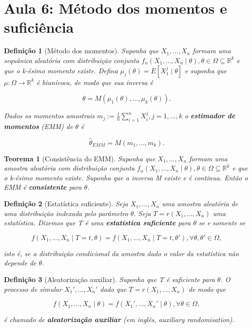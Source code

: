 \documentclass{article}
\newtheorem{theorem}{Teorema}
\newtheorem{definition}{Definição}
\begin{document}
\section*{Aula 6: Método dos momentos e suficiência}

\begin{definition}[Método dos momentos]
Suponha que $X_1, \ldots, X_n$ formam uma sequânica aleatória com distribuição conjunta $f_n (X_1, \ldots, X_n \mid \theta), \theta \in \Omega \subseteq \mathbb{R}^k$ e que o k-ésimo momento existe. Defina $\mu_j (\theta) = E[X_1^j \mid \theta]$ e suponha que $\mu: \Omega \rightarrow \mathbb{R}^k$ é biunívoca, de modo que sua inversa é

$$\theta = M(\mu_1(\theta), \ldots, \mu_k(\theta)).$$

Dados os momentos amostrais $m_j := \frac{1}{n} \sum_{i=1}^n X_i^j, j = 1, \ldots, k$ o \textbf{estimador de momentos} (EMM) de $\theta$ é

$$\hat{\theta}_{EMM} = M(m_1, \ldots, m_k).$$
\end{definition}

\begin{theorem}[Consistência do EMM]
Suponha que $X_1, \ldots, X_n$ formam uma amostra aleatória com distribuição conjunta  $f_n (X_1, \ldots, X_n \mid \theta), \theta \in \Omega \subseteq \mathbb{R}^k$ e que o k-ésimo momento existe. Suponha que a inversa M existe e é continua. Então o EMM é \textbf{consistente} para $\theta$.
\end{theorem}

\begin{definition}[Estatística suficiente]
Seja $X_1, \ldots, X_n$ uma amostra aleatória de uma distribuição indexada pelo parâmetro $\theta$. Seja $T = r(X_1, \ldots, X_n)$ uma estatística. Dizemos que T é uma \textbf{estatística suficiente} para $\theta$ se e somente se

\begin{equation}
    f(X_1, \ldots, X_n \mid T = t, \theta) = f(X_1, \ldots, X_n \mid T = t, \theta'), \forall \theta, \theta' \in \Omega,
\end{equation}

isto é, se a distribuição condicional da amostra dado o valor da estatística não depende de $\theta$.
\end{definition}

\begin{definition}[Aleatorização auxiliar]
 Suponha que T é suficiente para $\theta$. O processo de simular $X_1', \ldots, X_n'$ dado que $T = r(X_1, \ldots, X_n)$ de modo que 
 
 \begin{equation}
     f(X_1, \ldots, X_n \mid \theta) = f(X_1', \ldots, X_n' \mid \theta), \forall \theta \in \Omega,
 \end{equation}
 
 é chamado de \textbf{aleatorização auxiliar} (em inglês, auxiliary randomisation).
\end{definition}
\end{document}
